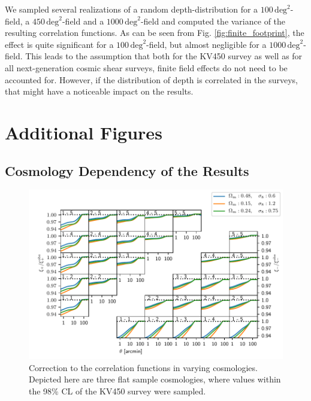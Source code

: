 \documentclass[referee]{aa} %
\renewcommand{\[}{\begin{equation}}
\renewcommand{\]}{\end{equation}}
\renewcommand{\rm}{\mathrm}
\begin{document}
\begin{appendix}
We sampled several realizations of a random depth-distribution for a $100\,\rm{deg}^2$-field, a $450\,\rm{deg}^2$-field and a $1000\,\rm{deg}^2$-field and computed the variance of the resulting correlation functions. As can be seen from Fig. \ref{fig:finite_footprint}, the effect is quite significant for a $100\,\rm{deg}^2$-field, but almost negligible for a $1000\,\rm{deg}^2$-field. This leads to the assumption that both for the KV450 survey as well as for all next-generation cosmic shear surveys, finite field effects do not need to be accounted for. However, if the distribution of depth is correlated in the surveys, that might have a noticeable impact on the results.

\section{Additional Figures}

\subsection{Cosmology Dependency of the Results}
\begin{figure}[h]
\centering
\includegraphics[width=\textwidth]{images/compare_cosmos.pdf}
\caption{Correction to the correlation functions in varying cosmologies. Depicted here are three flat sample cosmologies, where values within the 98\% CL of the KV450 survey were sampled.}
\label{fig:comparecosmo}
\end{figure}
\end{appendix}
\end{document}
